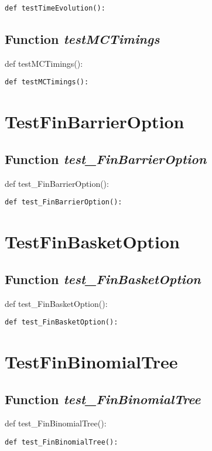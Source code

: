 \documentclass[twoside,11pt]{book}
\begin{document}
\begin{lstlisting}
def testTimeEvolution():
\end{lstlisting}

\subsection{Function {\it testMCTimings}}
def testMCTimings():

\begin{lstlisting}
def testMCTimings():
\end{lstlisting}


\newpage
\section{TestFinBarrierOption}

\subsection{Function {\it test\_FinBarrierOption}}
def test\_FinBarrierOption():

\begin{lstlisting}
def test_FinBarrierOption():
\end{lstlisting}


\newpage
\section{TestFinBasketOption}

\subsection{Function {\it test\_FinBasketOption}}
def test\_FinBasketOption():

\begin{lstlisting}
def test_FinBasketOption():
\end{lstlisting}


\newpage
\section{TestFinBinomialTree}

\subsection{Function {\it test\_FinBinomialTree}}
def test\_FinBinomialTree():

\begin{lstlisting}
def test_FinBinomialTree():
\end{lstlisting}
\end{document}
